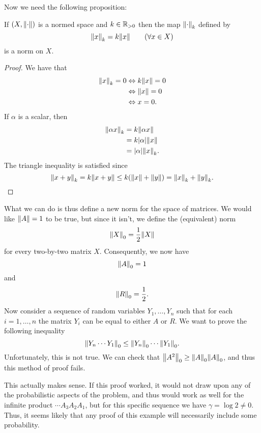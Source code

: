 \begin{example}
Now we need the following proposition:
\begin{proposition}
	If $(X, \norm{\cdot})$ is a normed space and $k \in \mathbb{R}_{> 0}$ then the map  $\norm{ \cdot }_k$ defined by
	\[
	\norm{ x }_k = k \norm{x} \qquad (\forall x \in X)
	\]
	 is a norm on $X$.
\end{proposition}
\begin{proof}
	We have that
	\begin{align*}
		\norm{x}_k = 0 & \Leftrightarrow  k \norm{x} =  0 \\
		&  \Leftrightarrow \norm{x} = 0 \\
	  & \Leftrightarrow  x = 0.
	\end{align*}
If $\alpha$ is a scalar, then 
 \begin{align*}
	\norm{\alpha x }_k & = k \norm{\alpha x}  \\
	& = k \abs{\alpha} \norm{x} \\
	& = \abs{\alpha} \norm{x}_k.
\end{align*}
The triangle inequality is satisfied since
\[
\norm{x + y}_k = k \norm{x + y} \leq k (\norm{x} + \norm{y})  = \norm{x}_k + \norm{y}_k.
\]
\end{proof}
What we can do is thus define a new norm for the space of matrices. We would like $\norm{A} = 1$ to be true, but since it isn't, we define the (equivalent) norm
\[
\norm{X}_0 = \frac{1}{2} \norm{X}
\]
for every two-by-two matrix $X$. Consequently, we now have
\[
\norm{A}_0 = 1
\]
and 
\[
\norm{R}_0 = \frac{1}{2}.\]
Now consider a sequence of random variables $Y_1, \ldots, Y_n$ such that for each $i = 1 , \ldots, n$ the matrix $Y_i$ can be equal to either $A$ or $R$. We want to prove the following inequality
\[
\norm{Y_n \cdots Y_1}_0 \leq \norm{Y_n}_0 \cdots  \norm{Y_1}_0.
\]
Unfortunately, this is not true. We can check that $\norm{A^2}_0 \geq \norm{A}_0 \norm{A}_0$, and thus this method of proof fails.
\begin{note}
	This actually makes sense. If this proof worked, it would not draw upon any of the probabilistic aspects of the problem, and thus would work as well for the infinite product $\cdots A_3 A_2 A_1$, but for this specific sequence we have $\gamma = \log 2 \neq 0$. Thus, it seems likely that any proof of this example will necessarily include some probability.
\end{note}
\end{example}
